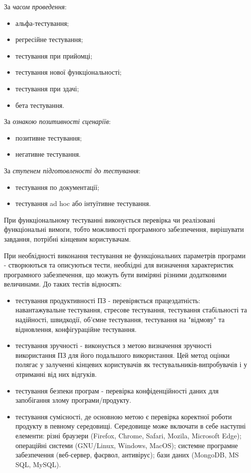 За \emph{часом проведення}:

\begin{itemize}
    \item альфа-тестування;
    \item регресійне тестування;
    \item тестування при прийомці;
    \item тестування нової функціональності;
    \item тестування при здачі;
    \item бета тестування.
\end{itemize}

За \emph{ознакою позитивності сценаріїв}:

\begin{itemize}
    \item позитивне тестування;
    \item негативне тестування.
\end{itemize}

За \emph{ступенем підготовленості до тестування}:

\begin{itemize}
    \item тестування по документації;
    \item тестування ad hoc або інтуїтивне тестування.
\end{itemize}

При функціональному тестуванні виконується перевірка чи реалізовані
функціональні вимоги, тобто можливості програмного забезпечення,
вирішувати завдання, потрібні кінцевим користувачам.

При необхідності виконання тестування не функціональних параметрів
програми - створюються та описуються тести, необхідні для визначення
характеристик програмного забезпечення, що можуть бути виміряні різними додатковими
величинами. До таких тестів відносять:

\begin{itemize}
    \item тестування продуктивності ПЗ - перевіряється працездатність:
      навантажувальне тестування, стресове тестування, тестування
      стабільності та надійності, швидкодії, об'ємне тестування,
      тестування на "відмову" та відновлення, конфігураційне тестування.
    \item тестування зручності - виконується з метою
      визначення зручності використання ПЗ 
      для його подальшого використання. Цей метод оцінки полягає
      у залученні кінцевих користувачів як тестувальників-випробувачів і
      у отриманні від них відгуків.
    \item тестування безпеки програм - перевірка конфіденційності
      даних для запобігання злому програми/продукту.
    \item тестування сумісності, де основною метою є
      перевірка коректної роботи продукту в певному середовищі.
      Середовище може включати в себе наступні елементи:
      різні браузери (Firefox, Chrome, Safari, Mozila, Microsoft Edge);
      операційні системи (GNU/Linux, Windows, MacOS); системне програмне
      забезпечення (веб-сервер, фаєрвол, антивірус);
      бази даних (MongoDB, MS SQL, MySQL).
\end{itemize}

